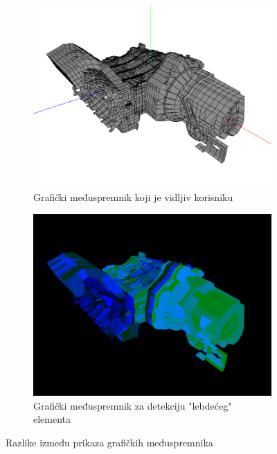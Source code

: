 \documentclass[times, utf8, diplomski]{fer}
\begin{document}
\begin{figure} [H]
     \centering
     \begin{subfigure}[h]{0.8\textwidth}
         \centering
         \includegraphics[width=\textwidth]{engine_default_color.png}
         \caption{Grafički međuspremnik koji je vidljiv korisniku}
         \label{fig:color-settings-normal-mode}
     \end{subfigure}
     \hfill
     \begin{subfigure}[h]{0.8\textwidth}
         \centering
         \includegraphics[width=\textwidth]{engine_cell_selection.png}
         \caption{Grafički međuspremnik za detekciju "lebdećeg" elementa}
         \label{fig:color-settings-limits-mode}
     \end{subfigure}
     \caption{Razlike između prikaza grafičkih međuspremnika}
     \label{fig:framebuffers-example}
\end{figure}
\end{document}
